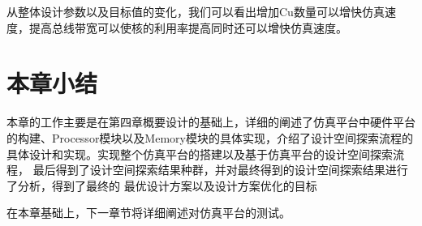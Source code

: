 从整体设计参数以及目标值的变化，我们可以看出增加Cu数量可以增快仿真速度，提高总线带宽可以使核的利用率提高同时还可以增快仿真速度。

\section{本章小结}

本章的工作主要是在第四章概要设计的基础上，详细的阐述了仿真平台中硬件平台
的构建、Processor模块以及Memory模块的具体实现，介绍了设计空间探索流程的
具体设计和实现。实现整个仿真平台的搭建以及基于仿真平台的设计空间探索流程，
最后得到了设计空间探索结果种群，并对最终得到的设计空间探索结果进行了分析，得到了最终的
最优设计方案以及设计方案优化的目标

在本章基础上，下一章节将详细阐述对仿真平台的测试。